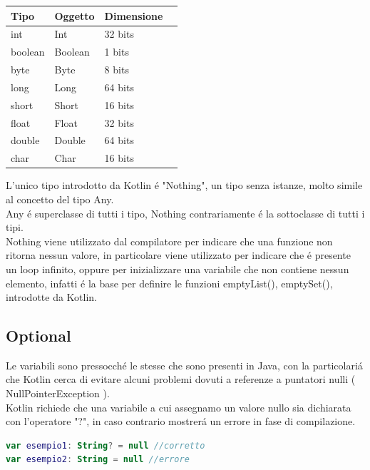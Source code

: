 \begin{center}
    \begin{tabular}{ | l | l | l | p{5cm} |}
    \hline
    Tipo & Oggetto & Dimensione \\ \hline
    int & Int & 32 bits\\ \hline
    boolean & Boolean & 1 bits\\ \hline
    byte & Byte & 8 bits\\ \hline
    long & Long & 64 bits\\ \hline
    short & Short & 16 bits\\ \hline
    float & Float & 32 bits\\ \hline
    double & Double & 64 bits\\ \hline
    char & Char & 16 bits\\ \hline

    \end{tabular}
\end{center}
L'unico tipo introdotto da Kotlin \'e "Nothing", un tipo senza istanze, molto simile al concetto del tipo Any.\\
Any \'e superclasse di tutti i tipo, Nothing contrariamente \'e la sottoclasse di tutti i tipi.\\
Nothing viene utilizzato dal compilatore per indicare che una funzione non ritorna nessun valore, in particolare viene utilizzato per indicare che \'e presente un loop infinito, oppure per inizializzare una variabile che non contiene nessun elemento, infatti \'e la base per definire le funzioni emptyList(), emptySet(), introdotte da Kotlin.


\subsection{Optional}

Le variabili sono pressocch\'e le stesse che sono presenti in Java, con la particolari\'a che Kotlin cerca di evitare alcuni problemi dovuti a referenze a puntatori nulli ( NullPointerException ). \\
Kotlin richiede che una variabile a cui assegnamo un valore nullo sia dichiarata con l'operatore "?", in caso contrario mostrer\'a un errore in fase di compilazione.

\begin{lstlisting}[language=kotlin,caption={Esempio}]
var esempio1: String? = null //corretto
var esempio2: String = null //errore
\end{lstlisting}

